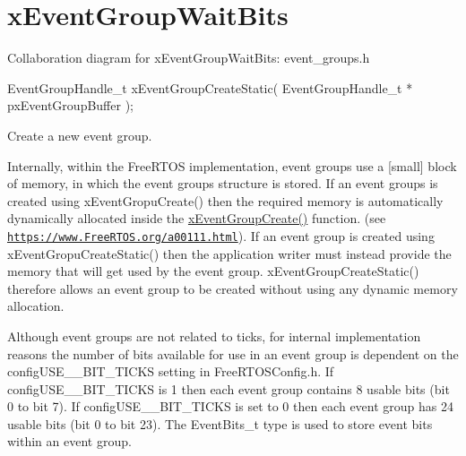 \hypertarget{group__x_event_group_wait_bits}{}\section{x\+Event\+Group\+Wait\+Bits}
\label{group__x_event_group_wait_bits}
Collaboration diagram for x\+Event\+Group\+Wait\+Bits\+:
event\+\_\+groups.\+h 
\begin{DoxyPre}
EventGroupHandle\_t xEventGroupCreateStatic( EventGroupHandle\_t * pxEventGroupBuffer );
\end{DoxyPre}


Create a new event group.

Internally, within the Free\+R\+T\+OS implementation, event groups use a \mbox{[}small\mbox{]} block of memory, in which the event group\textquotesingle{}s structure is stored. If an event groups is created using x\+Event\+Gropu\+Create() then the required memory is automatically dynamically allocated inside the \hyperlink{vendor_2ceedling_2plugins_2freertos_2src_2freertos_2include_2event__groups_8h_a7ed741a0902718aca9c8d3ca273f1b73}{x\+Event\+Group\+Create()} function. (see \href{https://www.FreeRTOS.org/a00111.html}{\tt https\+://www.\+Free\+R\+T\+O\+S.\+org/a00111.\+html}). If an event group is created using x\+Event\+Gropu\+Create\+Static() then the application writer must instead provide the memory that will get used by the event group. x\+Event\+Group\+Create\+Static() therefore allows an event group to be created without using any dynamic memory allocation.

Although event groups are not related to ticks, for internal implementation reasons the number of bits available for use in an event group is dependent on the config\+U\+S\+E\+\_\+\_\+\+B\+I\+T\+\_\+\+T\+I\+C\+KS setting in Free\+R\+T\+O\+S\+Config.\+h. If config\+U\+S\+E\+\_\+\_\+\+B\+I\+T\+\_\+\+T\+I\+C\+KS is 1 then each event group contains 8 usable bits (bit 0 to bit 7). If config\+U\+S\+E\+\_\+\_\+\+B\+I\+T\+\_\+\+T\+I\+C\+KS is set to 0 then each event group has 24 usable bits (bit 0 to bit 23). The Event\+Bits\+\_\+t type is used to store event bits within an event group.


